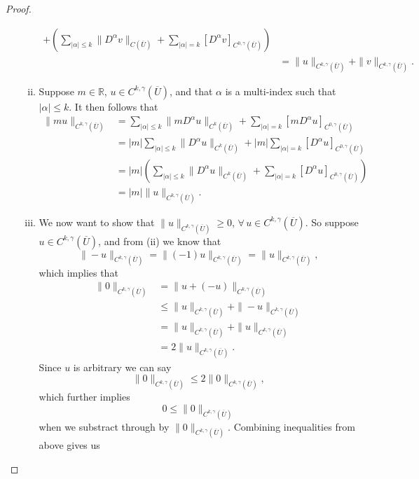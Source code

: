 \documentclass[11pt]{article}
\begin{document}
\begin{proof}
\begin{enumerate}[1.]
\begin{enumerate}[(i)]
\begin{align}
						    + (\sum_{|\alpha| \leq k}\|D^{\alpha}v\|_{C(\overline{U})} + \sum_{|\alpha| = k}[D^{\alpha}v]_{C^{0,\gamma}(\overline{U})})\\
					        &= \|u\|_{C^{k,\gamma}(\overline{U})} + \|v\|_{C^{k,\gamma}(\overline{U})}.
					\end{align}
				\item Suppose $m \in \mathbb{R}$, $u \in C^{k,\gamma}(\overline{U})$, and that $\alpha$ is a multi-index such that
					$|\alpha| \leq k$. It then follows that
					\begin{align}
						\|mu\|_{C^{k,\gamma}(\overline{U})} &= \sum_{|\alpha| \leq k}\|mD^{\alpha}u\|_{C^k(\overline{U})}
						                                      +\sum_{|\alpha| = k}[mD^{\alpha}u]_{C^{0,\gamma}(\overline{U})} \\
										    &= |m|\sum_{|\alpha| \leq k}\|D^{\alpha}u\|_{C^k(\overline{U})}
						                                      +|m|\sum_{|\alpha| = k}[D^{\alpha}u]_{C^{0,\gamma}(\overline{U})} \\
										    &= |m|(\sum_{|\alpha| \leq k}\|D^{\alpha}u\|_{C^k(\overline{U})}
										      +\sum_{|\alpha| = k}[D^{\alpha}u]_{C^{0,\gamma}(\overline{U})}) \\
										    &= |m|\|u\|_{C^{k,\gamma}(\overline{U})}.
					\end{align}
				\item We now want to show that $\|u\|_{C^{k,\gamma}(\overline{U})} \geq 0$, $\forall \, u \in C^{k,\gamma}(\overline{U})$.
					So suppose $u \in C^{k,\gamma}(\overline{U})$, and from (ii) we know that
					\[\|-u\|_{C^{k,\gamma}(\overline{U})} = \|(-1)u\|_{C^{k,\gamma}(\overline{U})} = \|u\|_{C^{k,\gamma}(\overline{U})},\]
					which implies that
					\begin{align*}
						\|0\|_{C^{k,\gamma}(\overline{U})} &= \|u + (-u)\|_{C^{k,\gamma}(\overline{U})} \\
										   &\leq \|u\|_{C^{k,\gamma}(\overline{U})} + \|-u\|_{C^{k,\gamma}(\overline{U})} \\
										   &= \|u\|_{C^{k,\gamma}(\overline{U})} + \|u\|_{C^{k,\gamma}(\overline{U})}\\
										   &= 2\|u\|_{C^{k,\gamma}(\overline{U})}.
					\end{align*}
					Since $u$ is arbitrary we can say
					\[\|0\|_{C^{k,\gamma}(\overline{U})} \leq 2\|0\|_{C^{k,\gamma}(\overline{U})},\]
					which further implies
					\[0 \leq \|0\|_{C^{k,\gamma}(\overline{U})}\]
					when we substract through by $\|0\|_{C^{k,\gamma}(\overline{U})}$. Combining inequalities from above gives us

\end{enumerate}
\end{enumerate}
\end{proof}
\end{document}
